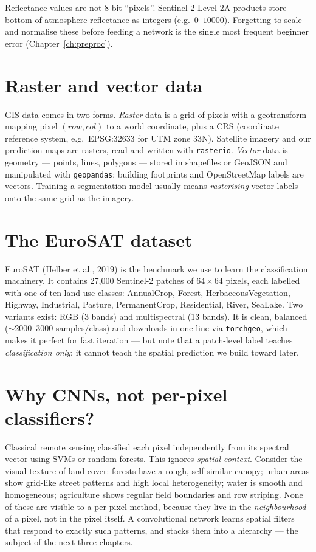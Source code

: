 \begin{notebox}
Reflectance values are not 8-bit ``pixels''. Sentinel-2 Level-2A products store
bottom-of-atmosphere reflectance as integers (e.g.\ $0$--$10000$). Forgetting to
scale and normalise these before feeding a network is the single most frequent
beginner error (Chapter~\ref{ch:preproc}).
\end{notebox}

\section{Raster and vector data}

GIS data comes in two forms. \emph{Raster} data is a grid of pixels with a
geotransform mapping pixel $(row,col)$ to a world coordinate, plus a CRS
(coordinate reference system, e.g.\ EPSG:32633 for UTM zone 33N). Satellite
imagery and our prediction maps are rasters, read and written with
\texttt{rasterio}. \emph{Vector} data is geometry --- points, lines, polygons
--- stored in shapefiles or GeoJSON and manipulated with \texttt{geopandas};
building footprints and OpenStreetMap labels are vectors. Training a
segmentation model usually means \emph{rasterising} vector labels onto the same
grid as the imagery.

\section{The EuroSAT dataset}

EuroSAT (Helber et al., 2019) is the benchmark we use to learn the
classification machinery. It contains 27{,}000 Sentinel-2 patches of
$64\times64$ pixels, each labelled with one of ten land-use classes:
\textsf{AnnualCrop, Forest, HerbaceousVegetation, Highway, Industrial,
Pasture, PermanentCrop, Residential, River, SeaLake}. Two variants exist: RGB
(3 bands) and multispectral (13 bands). It is clean, balanced
($\sim$2000--3000 samples/class) and downloads in one line via
\texttt{torchgeo}, which makes it perfect for fast iteration --- but note that a
patch-level label teaches \emph{classification only}; it cannot teach the
spatial prediction we build toward later.

\section{Why CNNs, not per-pixel classifiers?}

Classical remote sensing classified each pixel independently from its spectral
vector using SVMs or random forests. This ignores \emph{spatial context}.
Consider the visual texture of land cover: forests have a rough, self-similar
canopy; urban areas show grid-like street patterns and high local heterogeneity;
water is smooth and homogeneous; agriculture shows regular field boundaries and
row striping. None of these are visible to a per-pixel method, because they live
in the \emph{neighbourhood} of a pixel, not in the pixel itself. A convolutional
network learns spatial filters that respond to exactly such patterns, and
stacks them into a hierarchy --- the subject of the next three chapters.

